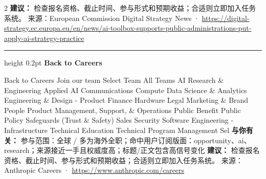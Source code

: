 \documentclass[10.5pt]{ctexart}
\begin{document}
\begin{multicols}{2}
\textbf{建议：} 检查报名资格、截止时间、参与形式和预期收益；合适则立即加入任务系统。
{\footnotesize\color{ormuted} 来源：European Commission Digital Strategy News · \url{https://digital-strategy.ec.europa.eu/en/news/ai-toolbox-supports-public-administrations-put-apply-ai-strategy-practice}}
\vspace{2mm}
\hrule height 0.2pt
\vspace{2mm}
{\large\bfseries Back to Careers}\par
Back to Careers Join our team Select Team All Teams AI Research \& Engineering Applied AI Communications Compute Data Science \& Analytics Engineering \& Design - Product Finance Hardware Legal Marketing \& Brand People Product Management, Support, \& Operations Public Benefit Public Policy Safeguards (Trust \& Safety) Sales Security Software Engineering - Infrastructure Technical Education Technical Program Management Sel
\textbf{与你有关：} 参与范围：全球 / 多为海外全职；命中用户订阅版面：opportunity、ai、research；来源接近一手且权威度高；标题/正文包含高信号变化
\textbf{建议：} 检查报名资格、截止时间、参与形式和预期收益；合适则立即加入任务系统。
{\footnotesize\color{ormuted} 来源：Anthropic Careers · \url{https://www.anthropic.com/careers}}
\end{multicols}
\end{document}
